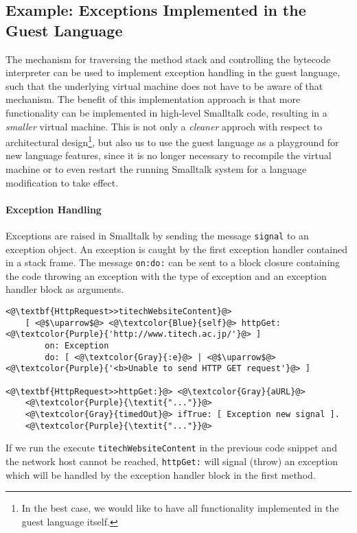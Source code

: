 \documentclass[12pt]{article}
\begin{document}
\subsection{Example: Exceptions Implemented in the Guest Language}
The mechanism for traversing the method stack and controlling the bytecode interpreter can be used to implement exception handling in the guest language, such that the underlying virtual machine does not have to be aware of that mechanism. The benefit of this implementation approach is that more functionality can be implemented in high-level Smalltalk code, resulting in a \emph{smaller} virtual machine. This is not only a \emph{cleaner} approch with respect to architectural design\footnote{In the best case, we would like to have all functionality implemented in the guest language itself.}, but also us to use the guest language as a playground for new language features, since it is no longer necessary to recompile the virtual machine or to even restart the running Smalltalk system for a language modification to take effect.

\paragraph{Exception Handling}
Exceptions are raised in Smalltalk by sending the message \texttt{signal} to an exception object. An exception is caught by the first exception handler contained in a stack frame. The message \texttt{on:do:} can be sent to a block closure containing the code throwing an exception with the type of exception and an exception handler block as arguments.

\begin{lstlisting}
<@\textbf{HttpRequest>>titechWebsiteContent}@>
    [ <@$\uparrow$@> <@\textcolor{Blue}{self}@> httpGet: <@\textcolor{Purple}{'http://www.titech.ac.jp/'}@> ] 
        on: Exception
        do: [ <@\textcolor{Gray}{:e}@> | <@$\uparrow$@> <@\textcolor{Purple}{'<b>Unable to send HTTP GET request'}@> ]

<@\textbf{HttpRequest>>httpGet:}@> <@\textcolor{Gray}{aURL}@>
    <@\textcolor{Purple}{\textit{"..."}}@>
    <@\textcolor{Gray}{timedOut}@> ifTrue: [ Exception new signal ].
    <@\textcolor{Purple}{\textit{"..."}}@>
\end{lstlisting}

If we run the execute \texttt{titechWebsiteContent} in the previous code snippet and the network host cannot be reached, \texttt{httpGet:} will signal (throw) an exception which will be handled by the exception handler block in the first method.
\end{document}

